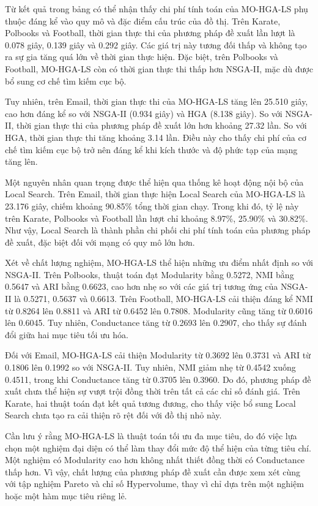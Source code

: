 \documentclass[14pt,a4paper]{extarticle}
\begin{document}
Từ kết quả trong bảng có thể nhận thấy chi phí tính toán của MO-HGA-LS phụ thuộc đáng kể vào quy mô và đặc điểm cấu trúc của đồ thị. Trên Karate, Polbooks và Football, thời gian thực thi của phương pháp đề xuất lần lượt là 0.078 giây, 0.139 giây và 0.292 giây. Các giá trị này tương đối thấp và không tạo ra sự gia tăng quá lớn về thời gian thực hiện. Đặc biệt, trên Polbooks và Football, MO-HGA-LS còn có thời gian thực thi thấp hơn NSGA-II, mặc dù được bổ sung cơ chế tìm kiếm cục bộ.

Tuy nhiên, trên Email, thời gian thực thi của MO-HGA-LS tăng lên 25.510 giây, cao hơn đáng kể so với NSGA-II (0.934 giây) và HGA (8.138 giây). So với NSGA-II, thời gian thực thi của phương pháp đề xuất lớn hơn khoảng 27.32 lần. So với HGA, thời gian thực thi tăng khoảng 3.14 lần. Điều này cho thấy chi phí của cơ chế tìm kiếm cục bộ trở nên đáng kể khi kích thước và độ phức tạp của mạng tăng lên.

Một nguyên nhân quan trọng được thể hiện qua thống kê hoạt động nội bộ của Local Search. Trên Email, thời gian thực hiện Local Search của MO-HGA-LS là 23.176 giây, chiếm khoảng 90.85\% tổng thời gian chạy. Trong khi đó, tỷ lệ này trên Karate, Polbooks và Football lần lượt chỉ khoảng 8.97\%, 25.90\% và 30.82\%. Như vậy, Local Search là thành phần chi phối chi phí tính toán của phương pháp đề xuất, đặc biệt đối với mạng có quy mô lớn hơn.

Xét về chất lượng nghiệm, MO-HGA-LS thể hiện những ưu điểm nhất định so với NSGA-II. Trên Polbooks, thuật toán đạt Modularity bằng 0.5272, NMI bằng 0.5647 và ARI bằng 0.6623, cao hơn nhẹ so với các giá trị tương ứng của NSGA-II là 0.5271, 0.5637 và 0.6613. Trên Football, MO-HGA-LS cải thiện đáng kể NMI từ 0.8264 lên 0.8811 và ARI từ 0.6452 lên 0.7808. Modularity cũng tăng từ 0.6016 lên 0.6045. Tuy nhiên, Conductance tăng từ 0.2693 lên 0.2907, cho thấy sự đánh đổi giữa hai mục tiêu tối ưu hóa.

Đối với Email, MO-HGA-LS cải thiện Modularity từ 0.3692 lên 0.3731 và ARI từ 0.1806 lên 0.1992 so với NSGA-II. Tuy nhiên, NMI giảm nhẹ từ 0.4542 xuống 0.4511, trong khi Conductance tăng từ 0.3705 lên 0.3960. Do đó, phương pháp đề xuất chưa thể hiện sự vượt trội đồng thời trên tất cả các chỉ số đánh giá. Trên Karate, hai thuật toán đạt kết quả tương đương, cho thấy việc bổ sung Local Search chưa tạo ra cải thiện rõ rệt đối với đồ thị nhỏ này.

Cần lưu ý rằng MO-HGA-LS là thuật toán tối ưu đa mục tiêu, do đó việc lựa chọn một nghiệm đại diện có thể làm thay đổi mức độ thể hiện của từng tiêu chí. Một nghiệm có Modularity cao hơn không nhất thiết đồng thời có Conductance thấp hơn. Vì vậy, chất lượng của phương pháp đề xuất cần được xem xét cùng với tập nghiệm Pareto và chỉ số Hypervolume, thay vì chỉ dựa trên một nghiệm hoặc một hàm mục tiêu riêng lẻ.
\end{document}
